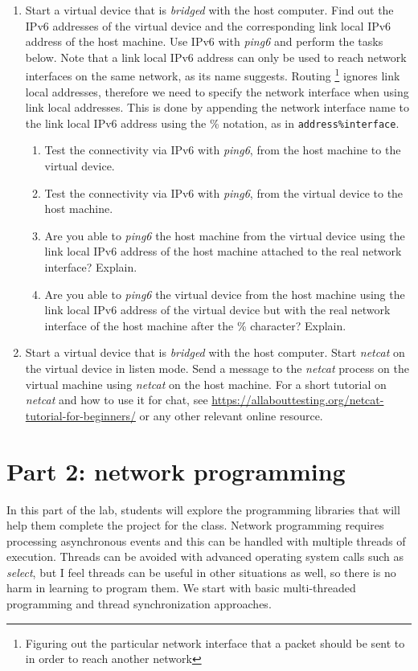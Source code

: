 \documentclass[12pt]{book}
\begin{document}
\begin{enumerate}
\item Start a virtual device that is \emph{bridged} with the host computer. Find out the IPv6 addresses of the virtual device and the corresponding link local IPv6 address of the host machine. Use IPv6 with \emph{ping6} and perform the tasks below. Note that a link local IPv6 address can only be used to reach network interfaces on the same network, as its name suggests. Routing \footnote{Figuring out the particular network interface that a packet should be sent to in order to reach another network} ignores link local addresses, therefore we need to specify the network interface when using link local addresses. This is done by appending the network interface name to the link local IPv6 address using the \% notation, as in \lstinline$address%interface$. 
\begin{enumerate}[label=(\alph*)]
\item Test the connectivity via IPv6 with \emph{ping6}, from the host machine to the virtual device.
\item Test the connectivity via IPv6 with \emph{ping6}, from the virtual device to the host machine.
\item Are you able to \emph{ping6} the host machine from the virtual device using the link local IPv6 address of the host machine attached to the real network interface? Explain.
\item Are you able to \emph{ping6} the virtual device from the host machine using the link local IPv6 address of the virtual device but with the real network interface of the host machine after the \% character? Explain.
\end{enumerate}

\item Start a virtual device that is \emph{bridged} with the host computer. Start \emph{netcat} on the virtual device in listen mode. Send a message to the \emph{netcat} process on the virtual machine using \emph{netcat} on the host machine. For a short tutorial on \emph{netcat} and how to use it for chat, see \url{https://allabouttesting.org/netcat-tutorial-for-beginners/} or any other relevant online resource.
\end{enumerate}


\section{Part 2: network programming}

In this part of the lab, students will explore the programming libraries that will help them complete the project for the class. Network programming requires processing asynchronous events and this can be handled with multiple threads of execution. Threads can be avoided with advanced operating system calls such as \emph{select}, but I feel threads can be useful in other situations as well, so there is no harm in learning to program them. We start with basic multi-threaded programming and thread synchronization approaches. 
\end{document}
